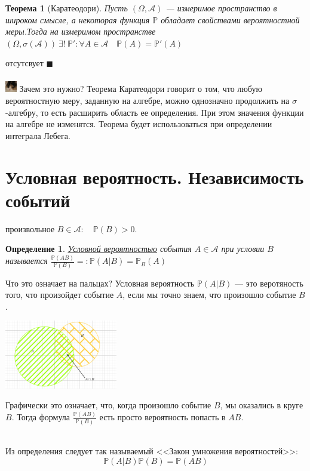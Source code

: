 \documentclass[12pt]{article}
\newtheorem{Th}{Теорема}
\newtheorem{Def}{Определение}
\newenvironment{Proof}{\par\noindent{\bf Доказательство}}{$\blacksquare$}
\newenvironment{Why}{\includegraphics[height= 5mm]{cat}}{}
\numberwithin{Th}{section}
\numberwithin{Def}{section}
\numberwithin{Lem}{section}
\numberwithin{St}{section}
\numberwithin{equation}{section}
\newcommand\Pro{\mathbb{P}}
\newcommand\Ev{\mathscr{A}}
\begin{document}
\begin{Th}[Каратеодори]
Пусть $(\Omega, \Ev)$ --- измеримое пространство в широком смысле, а некоторая функция $\Pro$ обладает свойствами вероятностной меры.Тогда на измеримом пространстве
$(\Omega, \sigma(\Ev))\  \exists !\  \Pro' \colon \forall A \in \Ev \quad \Pro(A) = \Pro'(A)$
\end{Th}
\begin{Proof}
отсутсвует
\end{Proof}\\\\
\begin{Why}
Зачем это нужно? Теорема Каратеодори говорит о том, что любую вероятностную меру, заданную на алгебре, можно однозначно продолжить на $\sigma$-алгебру,
то есть расширить область ее определения. При этом значения функции на алгебре не изменятся. Теорема будет использоваться при определении интеграла Лебега.
\end{Why}
\newpage


\section{Условная вероятность. Независимость событий}

 произвольное $B \in \Ev \colon \quad \Pro(B) > 0$.
\begin{Def}
\underline{Условной вероятностью} события $A \in \Ev$ при условии $B$ называется $\frac{\Pro(AB)}{\Pro(B)} =\colon \Pro(A|B) = \Pro_B(A)$
\end{Def}

Что это означает на пальцах? Условная вероятность $\Pro(A|B)$ --- это веротяность того, что произойдет событие $A$, если мы точно знаем, что произошло событие $B$.\\

\parbox[b][3 cm][t]{20mm}{\includegraphics[height=30mm]{cond_prob}}
\hfill
\parbox[b][3 cm][t]{100mm}{
	Графически это означает, что, когда произошло событие $B$, мы оказались в круге $B$. Тогда формула  $\frac{\Pro(AB)}{\Pro(B)}$ есть просто вероятность попасть в $AB$.
}\\

Из определения следует так называемый <<Закон умножения вероятностей>>:
$$\Pro(A|B)\Pro(B)=\Pro(AB)$$
\end{document}
